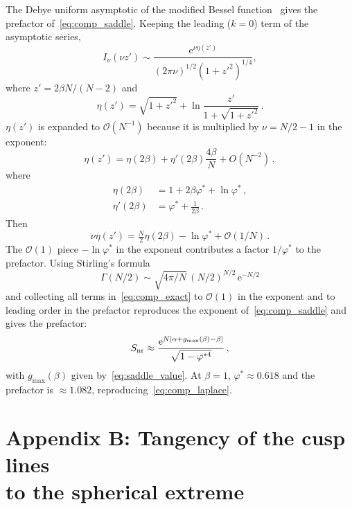 \documentclass[letterpaper]{article} %
\newcommand{\e}{{\mathrm{e}}}
\newcommand{\Bnet}{\beta}
\begin{document}
\label{app:prefactor}

The Debye uniform asymptotic of the modified Bessel function~\citep[10.41.3]{olver2010nist}
gives the prefactor of~\eqref{eq:comp_saddle}. Keeping the leading ($k = 0$) term of
the asymptotic series,
\begin{equation}
I_\nu(\nu z') \sim \frac{\e^{\nu\eta(z')}}{(2\pi\nu)^{1/2}(1+{z'}^2)^{1/4}},
\end{equation}
where $z' = 2\Bnet N/(N-2)$ and
\begin{equation}
    \eta(z') = \sqrt{1+{z'}^2} + \ln\frac{z'}{1+\sqrt{1+{z'}^2}}\,.
    \label{eq:bessel_debye}
\end{equation}  
$\eta(z')$ is expanded to $\mathcal{O}(N^{-1})$ because it is multiplied by
$\nu = N/2 - 1$ in the exponent:
\begin{equation}
    \eta(z') = \eta(2\Bnet) + \eta'(2\Bnet) \frac{4\Bnet}{N} + O(N^{-2})\,,
\end{equation}
where
\begin{align}
    \eta(2\Bnet)  &= 1 + 2\Bnet\varphi^* + \ln\varphi^*\,, \\
    \eta'(2\Bnet) &= \varphi^* + \frac{1}{2\Bnet}\,.
\end{align}
Then 
\begin{equation}
    \nu \eta(z') = \tfrac{N}{2} \eta(2\Bnet) - \ln\varphi^* + \mathcal{O}(1/N)\,.
\end{equation}
The $\mathcal{O}(1)$ piece $-\ln\varphi^*$ in the exponent contributes a factor
$1/\varphi^*$ to the prefactor. Using Stirling's formula
\begin{equation}
    \Gamma(N/2) \sim \sqrt{4\pi/N}\,(N/2)^{N/2}\,\e^{-N/2}
\end{equation} 
and collecting all terms in~\eqref{eq:comp_exact} to $\mathcal{O}(1)$ in the
exponent and to leading order in the prefactor reproduces the exponent
of~\eqref{eq:comp_saddle} and gives the prefactor:
\begin{equation}
S_{\rm nr} \approx \frac{\e^{N[\alpha + g_{\max}(\Bnet) - \Bnet]}}{\sqrt{1-\varphi^{*4}}}\,,
\end{equation}
with $g_{\max}(\Bnet)$ given by~\eqref{eq:saddle_value}.
At $\Bnet = 1$, $\varphi^* \approx 0.618$ and the prefactor is $\approx 1.082$, reproducing~\eqref{eq:comp_laplace}.


\section{Appendix B: Tangency of the cusp lines \\to the spherical extreme}
\end{document}
